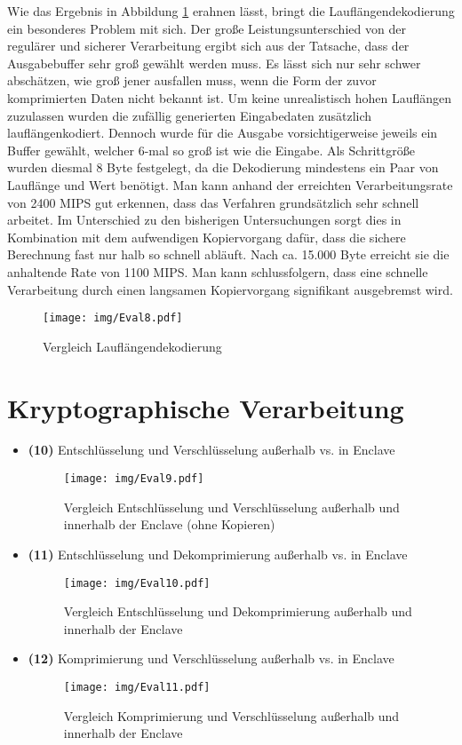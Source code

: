 Wie das Ergebnis in Abbildung \ref{fig:eval8} erahnen lässt, bringt die Lauflängendekodierung ein besonderes Problem mit sich. Der große Leistungsunterschied von der regulärer und sicherer Verarbeitung ergibt sich aus der Tatsache, dass der Ausgabebuffer sehr groß gewählt werden muss. Es lässt sich nur sehr schwer abschätzen, wie groß jener ausfallen muss, wenn die Form der zuvor komprimierten Daten nicht bekannt ist. Um keine unrealistisch hohen Lauflängen zuzulassen wurden die zufällig generierten Eingabedaten zusätzlich lauflängenkodiert. Dennoch wurde für die Ausgabe vorsichtigerweise jeweils ein Buffer gewählt, welcher 6-mal so groß ist wie die Eingabe. Als Schrittgröße wurden diesmal 8 Byte festgelegt, da die Dekodierung mindestens ein Paar von Lauflänge und Wert benötigt. Man kann anhand der erreichten Verarbeitungsrate von 2400 MIPS gut erkennen, dass das Verfahren grundsätzlich sehr schnell arbeitet. Im Unterschied zu den bisherigen Untersuchungen sorgt dies in Kombination mit dem aufwendigen Kopiervorgang dafür, dass die sichere Berechnung fast nur halb so schnell abläuft. Nach ca. 15.000 Byte erreicht sie die anhaltende Rate von 1100 MIPS. Man kann schlussfolgern, dass eine schnelle Verarbeitung durch einen langsamen Kopiervorgang signifikant ausgebremst wird.

\begin{figure}[h]
	\texttt{[image: img/Eval8.pdf]}
	\centering
	\caption{Vergleich Lauflängendekodierung}
	\label{fig:eval8}
\end{figure}

\section{Kryptographische Verarbeitung}
\begin{itemize}	
	\item \textbf{(10)} Entschlüsselung und Verschlüsselung außerhalb vs. in Enclave
	\begin{figure}[h]
		\texttt{[image: img/Eval9.pdf]}
		\centering
		\caption{Vergleich Entschlüsselung und Verschlüsselung außerhalb und innerhalb der Enclave (ohne Kopieren)}
		\label{fig:eval9}
	\end{figure}
	
	\item \textbf{(11)} Entschlüsselung und Dekomprimierung außerhalb vs. in Enclave
	\begin{figure}[h]
		\texttt{[image: img/Eval10.pdf]}
		\centering
		\caption{Vergleich Entschlüsselung und Dekomprimierung außerhalb und innerhalb der Enclave}
		\label{fig:eval10}
	\end{figure}
	
	\item \textbf{(12)} Komprimierung und Verschlüsselung außerhalb vs. in Enclave
	\begin{figure}[h]
		\texttt{[image: img/Eval11.pdf]}
		\centering
		\caption{Vergleich Komprimierung und Verschlüsselung außerhalb und innerhalb der Enclave}
		\label{fig:eval11}
	\end{figure}
	
\end{itemize}

